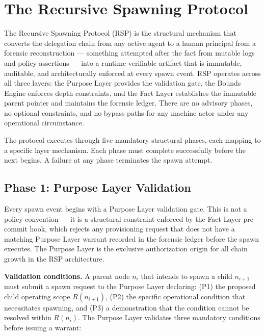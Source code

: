 \section{The Recursive Spawning Protocol}
\label{sec:rs-protocol}

The Recursive Spawning Protocol (RSP) is the structural mechanism that converts the delegation chain from any active agent to a human principal from a forensic reconstruction — something attempted after the fact from mutable logs and policy assertions — into a runtime-verifiable artifact that is immutable, auditable, and architecturally enforced at every spawn event. RSP operates across all three \bxthree{} layers: the Purpose Layer provides the validation gate, the Bounds Engine enforces depth constraints, and the Fact Layer establishes the immutable parent pointer and maintains the forensic ledger. There are no advisory phases, no optional constraints, and no bypass paths for any machine actor under any operational circumstance.

The protocol executes through five mandatory structural phases, each mapping to a specific \bxthree{} layer mechanism. Each phase must complete successfully before the next begins. A failure at any phase terminates the spawn attempt.

\subsection{Phase 1: Purpose Layer Validation}
\label{sec:rs-phase1}

Every spawn event begins with a Purpose Layer validation gate. This is not a policy convention — it is a structural constraint enforced by the Fact Layer pre-commit hook, which rejects any provisioning request that does not have a matching Purpose Layer warrant recorded in the forensic ledger before the spawn executes. The Purpose Layer is the exclusive authorization origin for all chain growth in the RSP architecture.

\medskip
\noindent\textbf{Validation conditions.} A parent node $n_i$ that intends to spawn a child $n_{i+1}$ must submit a spawn request to the Purpose Layer declaring: (P1) the proposed child operating scope $R(n_{i+1})$, (P2) the specific operational condition that necessitates spawning, and (P3) a demonstration that the condition cannot be resolved within $R(n_i)$. The Purpose Layer validates three mandatory conditions before issuing a warrant:


